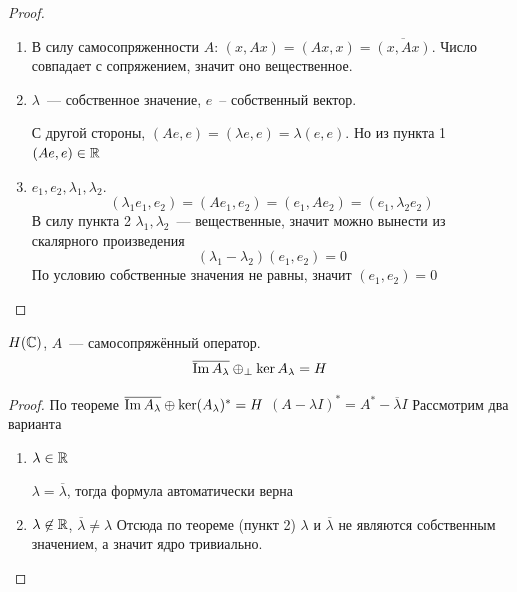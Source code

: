 \begin{proof}
    \begin{enumerate}
        \item В силу самосопряженности $A$: $(x, Ax)=(Ax, x)=\overline{(x, Ax)}$. Число совпадает с сопряжением, значит оно вещественное.
        
        \item $\lambda$~--- собственное значение, $e$~-- собственный вектор.
        
        С другой стороны, 
        $(Ae, e) = (\lambda e, e) = \lambda (e, e)$. Но из пункта 1
        $(Ae, e) \in \mathbb{R}$
    
        \item $e_1, e_2, \lambda_1, \lambda_2$. 
        \[ (\lambda_1 e_1, e_2) = (Ae_1, e_2)=(e_1, Ae_2) = (e_1, \lambda_2 e_2)\]
        В силу пункта 2 $\lambda_1, \lambda_2$~--- вещественные, значит можно вынести из скалярного произведения
        \[ (\lambda_1 - \lambda_2) (e_1, e_2) = 0\]
        По условию собственные значения не равны, значит $(e_1, e_2)=0$
    \end{enumerate}
\end{proof}

\begin{theorem}[11.2]\label{11.2}
    $H(\mathbb{C})$, $A$~--- самосопряжённый оператор.
    \[
    \overline{\operatorname{Im} A_{\lambda}} \oplus_{\perp} \ker A_{\lambda} = H
    \]
\end{theorem}

\begin{proof}
    По теореме  $\overline{\operatorname{Im} A_\lambda} \oplus \ker (A_\lambda)^*=H$
    $(A - \lambda I)^* = A^* - \overline{\lambda} I$
    Рассмотрим два варианта
    \begin{enumerate}
        \item $\lambda \in \mathbb{R}$
        
        $\lambda = \overline{\lambda}$, тогда формула автоматически верна
        \item $\lambda \not\in \mathbb{R}$, $\overline{\lambda} \neq \lambda$ 
        Отсюда по теореме  (пункт 2) $\lambda$ и $\overline{\lambda}$
        не являются собственным значением, а значит ядро тривиально.
        \end{enumerate}
\end{proof}

